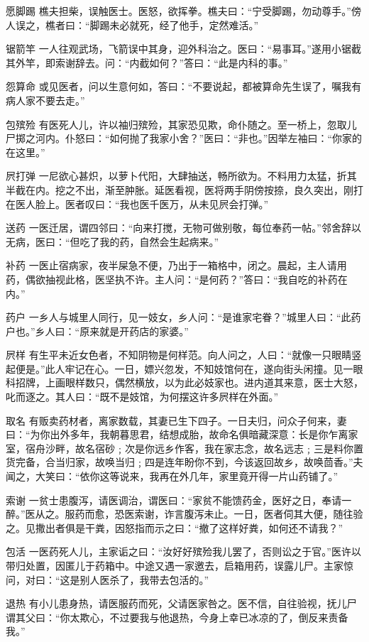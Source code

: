 \documentclass[12pt,UTF8]{ctexbook}
\begin{document}
愿脚踢
樵夫担柴，误触医士。医怒，欲挥拳。樵夫曰：“宁受脚踢，勿动尊手。”傍人误之，樵者曰：“脚踢未必就死，经了他手，定然难活。”

锯箭竿
一人往观武场，飞箭误中其身，迎外科治之。医曰：“易事耳。”遂用小锯截其外竿，即索谢辞去。问：“内截如何？”答曰：“此是内科的事。”

怨算命
或见医者，问以生意何如，答曰：“不要说起，都被算命先生误了，嘱我有病人家不要去走。”

包殡殓
有医死人儿，许以袖归殡殓，其家恐见欺，命仆随之。至一桥上，忽取儿尸掷之河内。仆怒曰：“如何抛了我家小舍？”医曰：“非也。”因举左袖曰：“你家的在这里。”

屄打弹
一尼欲心甚炽，以萝卜代阳，大肆抽送，畅所欲为。不料用力太猛，折其半截在内。挖之不出，渐至肿胀。延医看视，医将两手阴傍按捺，良久突出，刚打在医人脸上。医者叹曰：“我也医千医万，从未见屄会打弹。”

送药
一医迁居，谓四邻曰：“向来打搅，无物可做别敬，每位奉药一帖。”邻舍辞以无病，医曰：“但吃了我的药，自然会生起病来。”

补药
一医止宿病家，夜半屎急不便，乃出于一箱格中，闭之。晨起，主人请用药，偶欲抽视此格，医坚执不许。主人问：“是何药？”答曰：“我自吃的补药在内。”

药户
一乡人与城里人同行，见一妓女，乡人问：“是谁家宅眷？”城里人曰：“此药户也。”乡人曰：“原来就是开药店的家婆。”

屄样
有生平未近女色者，不知阴物是何样范。向人问之，人曰：“就像一只眼睛竖起便是。”此人牢记在心。一日，嫖兴忽发，不知妓馆何在，遂向街头闲撞。见一眼科招牌，上画眼样数只，偶然横放，以为此必妓家也。进内道其来意，医士大怒，叱而逐之。其人曰：“既不是妓馆，为何摆这许多屄样在外面。”

取名
有贩卖药材者，离家数载，其妻已生下四子。一日夫归，问众子何来，妻曰：“为你出外多年，我朝暮思君，结想成胎，故命名俱暗藏深意：长是你乍离家室，宿舟沙畔，故名宿砂﹔次是你远乡作客，我在家志念，故名远志﹔三是料你置货完备，合当归家，故唤当归﹔四是连年盼你不到，今该返回故乡，故唤茴香。”夫闻之，大笑曰：“依你这等说来，我再在外几年，家里竟开得一片山药铺了。”

索谢
一贫士患腹泻，请医调治，谓医曰：“家贫不能馈药金，医好之日，奉请一醉。”医从之。服药而愈，恐医索谢，诈言腹泻未止。一日，医者伺其大便，随往验之。见撒出者俱是干粪，因怒指而示之曰：“撤了这样好粪，如何还不请我？”

包活
一医药死人儿，主家诟之曰：“汝好好殡殓我儿罢了，否则讼之于官。”医许以带归处置，因匿儿于药箱中。中途又遇一家邀去，启箱用药，误露儿尸。主家惊问，对曰：“这是别人医杀了，我带去包活的。”

退热
有小儿患身热，请医服药而死，父请医家咎之。医不信，自往验视，抚儿尸谓其父曰：“你太欺心，不过要我与他退热，今身上幸已冰凉的了，倒反来责备我。”
\end{document}

